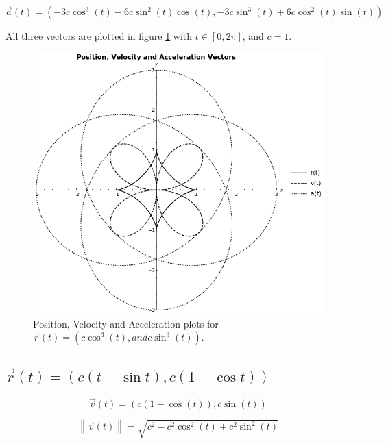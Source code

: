 \documentclass[letterpaper,12pt]{article}
\begin{document}
 \begin{equation*}
  \vec{a}(t) = (- 3 c \cos ^3 (t) - 6 c \sin ^2 (t) \cos (t), -3 c \sin ^3 (t) 
+ 6 c \cos ^2 (t) \sin (t))
 \end{equation*}
 
 All three vectors are plotted in figure \ref{fig: vector 3} with $t \in 
\left [ 0, 2 \pi \right ] $, and $c = 1$.
 
 \begin{figure}[h]
 \centering

\includegraphics[scale=0.4,keepaspectratio=true]{./img/graph03.png}
 \caption{Position, Velocity and Acceleration plots for 
$\vec{r}(t) = ( c \cos ^3 (t), and c \sin ^3 (t))$.
}
 \label{fig: vector 3}
\end{figure}




\subsection{$\vec{r}(t) = ( c (t - \sin t), c (1 - \cos t))$}
 
  \begin{equation*}
  \vec{v}(t) = (c (1 - \cos (t) ), c \sin (t))
 \end{equation*}


\begin{equation*}
 \left \| \vec{v}(t) \right \| = \sqrt{ c^2 - c^2 \cos ^2 (t) + c^2 \sin ^2 (t)}
\end{equation*}
\end{document}
